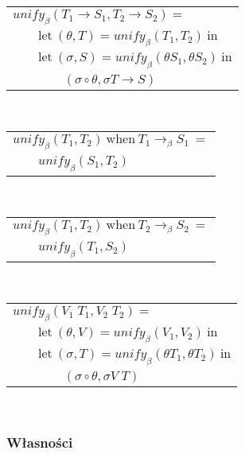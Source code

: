 \documentclass[11pt,leqno]{article}
\begin{document}
\begin{tabular}{l}
$unify_\beta(T_1 \rightarrow S_1, T_2 \rightarrow S_2) = $ \\
$\qquad \textrm{let} \ (\theta, T) = unify_\beta(T_1, T_2) \ \textrm{in} $ \\
$\qquad \textrm{let} \ (\sigma, S) = unify_\beta(\theta S_1, \theta S_2) \ \textrm{in} $ \\
$\qquad\qquad (\sigma \circ \theta, \sigma T \rightarrow S) $ \\
\end{tabular} \\
\begin{tabular}{l}
$unify_\beta(T_1, T_2) \ \textrm{when} \ T_1 \longrightarrow_\beta S_1 \ = $ \\
$\qquad unify_\beta(S_1, T_2)$ \\
\end{tabular} \\
\begin{tabular}{l}
$unify_\beta(T_1, T_2) \ \textrm{when} \ T_2 \longrightarrow_\beta S_2 \ = $ \\
$\qquad unify_\beta(T_1, S_2)$ \\
\end{tabular} \\
\begin{tabular}{l}
$unify_\beta(V_1 \; T_1, V_2 \; T_2) = $ \\
$\qquad \textrm{let} \ (\theta, V) = unify_\beta(V_1, V_2) \ \textrm{in} $ \\
$\qquad \textrm{let} \ (\sigma, T) = unify_\beta(\theta T_1, \theta T_2) \ \textrm{in} $ \\
$\qquad\qquad (\sigma \circ \theta, \sigma V \; T) $ \\
\end{tabular} \\

\subsubsection{Własności}
\end{document}
